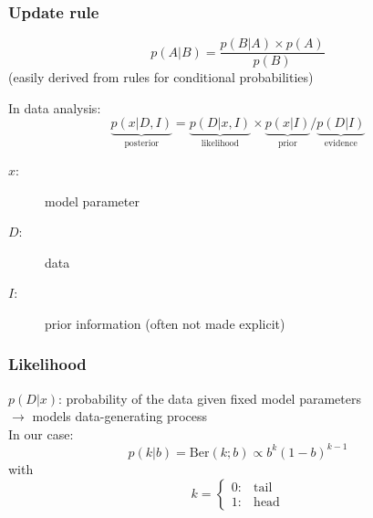 \documentclass[t,aspectratio=169]{beamer}
\begin{document}
\begin{frame}
  \frametitle{Update rule}
  \begin{tcolorbox}[title=Bayes' theorem]
    \begin{equation*}
      p(A|B) = \frac{p(B|A) \times p(A)}{p(B)}
    \end{equation*}
    (easily derived from rules for conditional probabilities)
  \end{tcolorbox}
  In data analysis:
  \begin{equation*}
    \underbrace{p(x|D,I)}_{\mathrm{posterior}} = \underbrace{p(D|x,I)}_{\mathrm{likelihood}} \times \underbrace{p(x|I)}_{\mathrm{prior}} / \underbrace{p(D|I)}_{\mathrm{evidence}}
  \end{equation*}
  \begin{description}
  \item[$x$:] model parameter
  \item[$D$:] data
  \item[$I$:] prior information (often not made explicit)
  \end{description}
\end{frame}


\begin{frame}
  \frametitle{Likelihood}
  $p(D|x)$: probability of the data given fixed model parameters\\
  $\rightarrow$ models data-generating process\\
  \bigbreak
  In our case:
  \begin{equation*}
    p(k|b) = \mathrm{Ber}(k;b) \propto b^k(1-b)^{k-1} 
  \end{equation*}
  with
  \begin{equation*}
    k = \begin{cases} 0:& \mathrm{tail}\\
      1:& \mathrm{head}
    \end{cases}
  \end{equation*}
  \vfill
  \centering
\end{frame}
\end{document}
